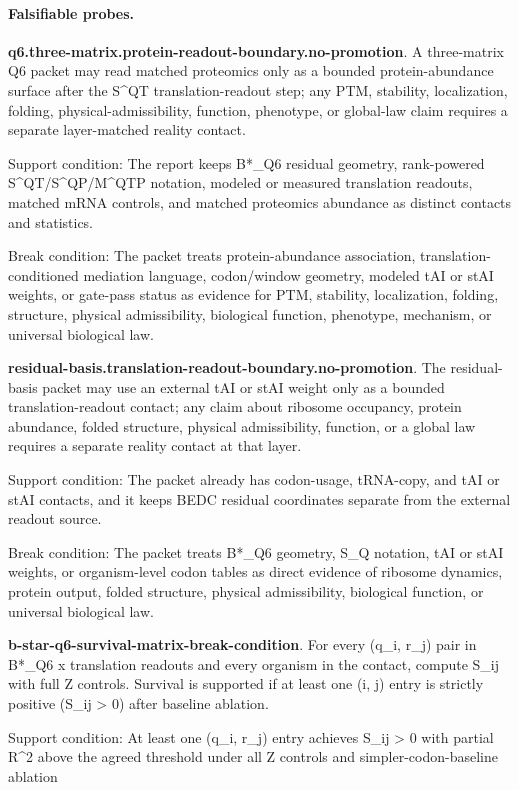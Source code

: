 \paragraph{Falsifiable probes.}
\textbf{q6.three-matrix.protein-readout-boundary.no-promotion}. A three-matrix Q6 packet may read matched proteomics only as a bounded protein-abundance surface after the S\textasciicircum{}QT translation-readout step; any PTM, stability, localization, folding, physical-admissibility, function, phenotype, or global-law claim requires a separate layer-matched reality contact.

Support condition: The report keeps B*\_Q6 residual geometry, rank-powered S\textasciicircum{}QT/S\textasciicircum{}QP/M\textasciicircum{}QTP notation, modeled or measured translation readouts, matched mRNA controls, and matched proteomics abundance as distinct contacts and statistics.

Break condition: The packet treats protein-abundance association, translation-conditioned mediation language, codon/window geometry, modeled tAI or stAI weights, or gate-pass status as evidence for PTM, stability, localization, folding, structure, physical admissibility, biological function, phenotype, mechanism, or universal biological law.

\textbf{residual-basis.translation-readout-boundary.no-promotion}. The residual-basis packet may use an external tAI or stAI weight only as a bounded translation-readout contact; any claim about ribosome occupancy, protein abundance, folded structure, physical admissibility, function, or a global law requires a separate reality contact at that layer.

Support condition: The packet already has codon-usage, tRNA-copy, and tAI or stAI contacts, and it keeps BEDC residual coordinates separate from the external readout source.

Break condition: The packet treats B*\_Q6 geometry, S\_Q notation, tAI or stAI weights, or organism-level codon tables as direct evidence of ribosome dynamics, protein output, folded structure, physical admissibility, biological function, or universal biological law.

\textbf{b-star-q6-survival-matrix-break-condition}. For every (q\_i, r\_j) pair in B*\_Q6 x translation readouts and every organism in the contact, compute S\_ij with full Z controls. Survival is supported if at least one (i, j) entry is strictly positive (S\_ij > 0) after baseline ablation.

Support condition: At least one (q\_i, r\_j) entry achieves S\_ij > 0 with partial R\textasciicircum{}2 above the agreed threshold under all Z controls and simpler-codon-baseline ablation

